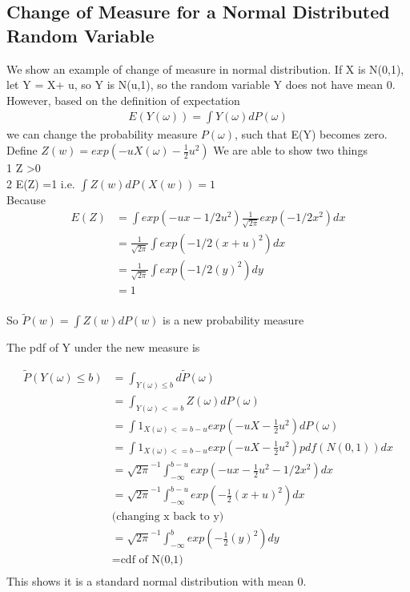 \documentclass[a4paper]{article}
\begin{document}
\subsection{Change of Measure for a Normal Distributed Random Variable}
We show an example of change of measure in normal distribution. If X is N(0,1), let Y = X+ u, so Y is N(u,1), so the random variable Y does not have mean 0. However, based
on the definition of expectation\\
\begin{align*}
	E(Y(\omega)) = \int Y(\omega) dP(\omega)
\end{align*}
we can change the probability measure $P(\omega)$, such that E(Y) becomes zero.
Define $Z(w) = exp(-uX(\omega) - \frac{1}{2}u^2)$
We are able to show two things\\ 
1 Z \textgreater 0 \\
2 E(Z) =1 i.e. $\int Z(w)dP(X(w)) = 1$ \\
Because 
\begin{align*}
E(Z)  & = \int exp(-ux-1/2u^2) \frac{1}{\sqrt{2\pi}} exp(-1/2x^2) dx\\
& = \frac{1}{\sqrt{2\pi}}  \int exp(-1/2(x+u)^2) dx \\
& = \frac{1}{\sqrt{2\pi}}  \int exp(-1/2(y)^2) dy \\
& = 1 \\
\end{align*}

So $\tilde P(w) = \int Z(w) dP(w)$ is a new probability measure

The pdf of Y under the new measure is

\begin{align*}
	\tilde P(Y(\omega) \leq b) & = \int_{Y(\omega) \leq b} d \tilde P(\omega) \\
&= \int_{Y(\omega)<=b} Z(\omega) dP(\omega) \\
&= \int 1_{X(\omega)<=b-u} exp(-uX- \frac{1}{2} u^2 )dP(\omega) \\
&=\int 1_{X(\omega)<=b-u} exp(-uX- \frac{1}{2} u^2 ) pdf(N(0,1)) dx \\
&=  {\sqrt{2\pi}}^{-1} \int_{-\infty}^{b-u} exp(-ux -\frac{1}{2}u^2 -1/2x^2) dx \\
&=  {\sqrt{2\pi}}^{-1}\int_{-\infty}^{b-u} exp(-\frac{1}{2} (x+u)^2) dx \\
&\textrm{(changing x back to y)}\\
&=  {\sqrt{2\pi}}^{-1}\int _{-\infty}^{b} exp(-\frac{1}{2} (y)^2) dy \\
&= \textrm{cdf of N(0,1)} \\
\end{align*}
This shows it is a standard normal distribution with mean 0.\\
\end{document}

